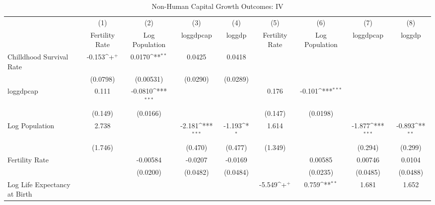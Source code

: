 \begin{table}[htbp]\centering
\def\sym#1{\ifmmode^{#1}\else\(^{#1}\)\fi}
\caption{Non-Human Capital Growth Outcomes: IV}
\begin{tabular}{l*{8}{c}}
\toprule
                &\multicolumn{1}{c}{(1)}&\multicolumn{1}{c}{(2)}&\multicolumn{1}{c}{(3)}&\multicolumn{1}{c}{(4)}&\multicolumn{1}{c}{(5)}&\multicolumn{1}{c}{(6)}&\multicolumn{1}{c}{(7)}&\multicolumn{1}{c}{(8)}\\
                &\multicolumn{1}{c}{Fertility Rate}&\multicolumn{1}{c}{Log Population}&\multicolumn{1}{c}{loggdpcap}&\multicolumn{1}{c}{loggdp}&\multicolumn{1}{c}{Fertility Rate}&\multicolumn{1}{c}{Log Population}&\multicolumn{1}{c}{loggdpcap}&\multicolumn{1}{c}{loggdp}\\
\midrule
Chilldhood Survival Rate&   -0.153\sym{+}  &   0.0170\sym{**} &   0.0425         &   0.0418         &                  &                  &                  &                  \\
                & (0.0798)         &(0.00531)         & (0.0290)         & (0.0289)         &                  &                  &                  &                  \\
\addlinespace
loggdpcap       &    0.111         &  -0.0810\sym{***}&                  &                  &    0.176         &   -0.101\sym{***}&                  &                  \\
                &  (0.149)         & (0.0166)         &                  &                  &  (0.147)         & (0.0198)         &                  &                  \\
\addlinespace
Log Population  &    2.738         &                  &   -2.181\sym{***}&   -1.193\sym{*}  &    1.614         &                  &   -1.877\sym{***}&   -0.893\sym{**} \\
                &  (1.746)         &                  &  (0.470)         &  (0.477)         &  (1.349)         &                  &  (0.294)         &  (0.299)         \\
\addlinespace
Fertility Rate  &                  & -0.00584         &  -0.0207         &  -0.0169         &                  &  0.00585         &  0.00746         &   0.0104         \\
                &                  & (0.0200)         & (0.0482)         & (0.0484)         &                  & (0.0235)         & (0.0485)         & (0.0488)         \\
\addlinespace
Log Life Expectancy at Birth&                  &                  &                  &                  &   -5.549\sym{+}  &    0.759\sym{**} &    1.681         &    1.652         \\

\end{tabular}
\end{table}
